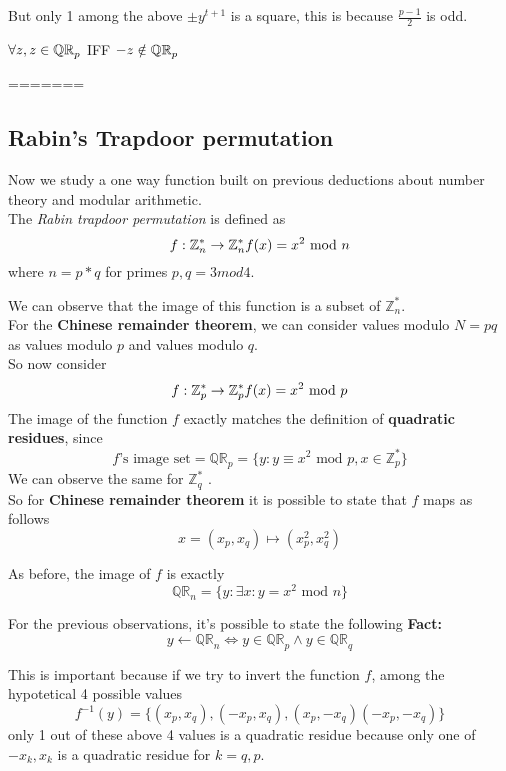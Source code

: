 But only 1 among the above $\pm y^{t+1}$ is a square, this is because $\frac{p-1}{2}$ is odd.

\begin{lemma}
    $\forall z, z\in \QR[p]$ IFF $-z\notin \QR[p]$
\end{lemma}



=======
\subsection{Rabin's Trapdoor permutation}
Now we study a one way function built on previous deductions about number
theory and modular arithmetic.\\

The \textit{Rabin trapdoor permutation} is defined as 
\[
    f: \mathbb{Z}^{*}_{n}  \to \mathbb{Z}^{*}_{n}  \newline
    f(x)=x^{2} \text{ mod } n
\]
where $n=p*q$ for primes $p,q=3 mod 4$.\\

We can observe that the image of this function is a subset of $
\mathbb{Z}^{*}_{n} $.\\

For the \textbf{Chinese remainder theorem}, we can consider values modulo
$N=pq$ as values modulo $p$ and values modulo $q$.\\
So now consider
\[
    f: \mathbb{Z}^{*}_{p}  \to \mathbb{Z}^{*}_{p}  \newline
    f(x)=x^{2} \text{ mod } p
\]
The image of the function $f$ exactly matches the definition of
\textbf{quadratic residues}, since 
\[
    f \text{'s image set}= \mathbb{QR}_{p}=\{y:y \equiv x^{2} 
    \text{ mod } p, x \in \mathbb{Z}^{*}_{p}   \} 
\]
We can observe the same for $\mathbb{Z}^{*}_{q}$ .\\

So for \textbf{Chinese remainder theorem} it is possible to state that $f$ maps
as follows
\[
    x= (x_{p}, x_{q}) \mapsto (x^{2}_{p}, x^{2}_{q})
\]

As before, the image of $f$ is exactly
\[
    \mathbb{QR}_{n} = \{ y: \exists x : y=x^{2} \text{ mod } n\}
\]

For the previous observations, it's possible to state the following \textbf{Fact:}
\[
y \leftarrow \mathbb{QR}_{n} \Leftrightarrow y \in \mathbb{QR}_{p} \wedge y \in
\mathbb{QR}_{q} 
\]

This is important because if we try to invert the function $f$, among the
hypotetical 4 possible values
\[
    f^{-1}(y)=\{ (x_{p}, x_{q}),(-x_{p}, x_{q}),(x_{p},- x_{q})(-x_{p},- x_{q})\}
\]\label{les15:outoffour}
only 1 out of these above 4 values is a quadratic residue because only one of
$-x_{k}, x_{k}$ is a quadratic residue for $k=q,p$.

